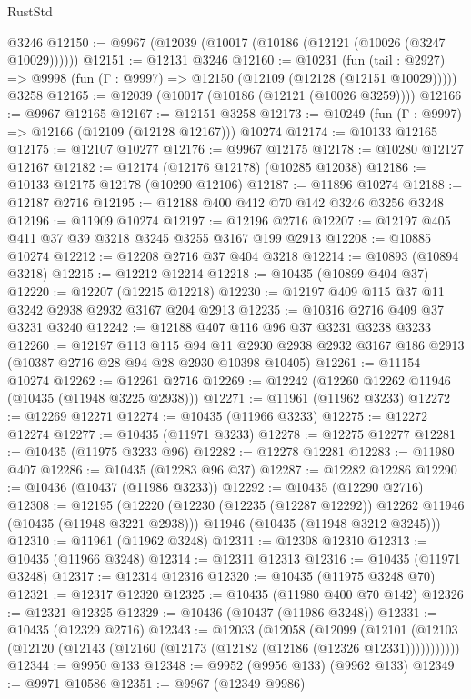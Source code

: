 \begin{lexlean}{RustStd}
\begin{coremodule}
    @3246
@12150 := @9967 (@12039 (@10017 (@10186 (@12121 (@10026 (@3247 @10029))))))
@12151 := @12131 @3246
@12160 := @10231
    (fun (tail : @2927) => @9998 (fun (Γ : @9997) => @12150 (@12109 (@12128 (@12151 @10029)))))
    @3258
@12165 := @12039 (@10017 (@10186 (@12121 (@10026 @3259))))
@12166 := @9967 @12165
@12167 := @12151 @3258
@12173 := @10249 (fun (Γ : @9997) => @12166 (@12109 (@12128 @12167))) @10274
@12174 := @10133 @12165
@12175 := @12107 @10277
@12176 := @9967 @12175
@12178 := @10280 @12127 @12167
@12182 := @12174 (@12176 @12178) (@10285 @12038)
@12186 := @10133 @12175 @12178 (@10290 @12106)
@12187 := @11896 @10274
@12188 := @12187 @2716
@12195 := @12188 @400 @412 @70 @142 @3246 @3256 @3248
@12196 := @11909 @10274
@12197 := @12196 @2716
@12207 := @12197 @405 @411 @37 @39 @3218 @3245 @3255 @3167 @199 @2913
@12208 := @10885 @10274
@12212 := @12208 @2716 @37 @404 @3218
@12214 := @10893 (@10894 @3218)
@12215 := @12212 @12214
@12218 := @10435 (@10899 @404 @37)
@12220 := @12207 (@12215 @12218)
@12230 := @12197 @409 @115 @37 @11 @3242 @2938 @2932 @3167 @204 @2913
@12235 := @10316 @2716 @409 @37 @3231 @3240
@12242 := @12188 @407 @116 @96 @37 @3231 @3238 @3233
@12260 := @12197
    @113
    @115
    @94
    @11
    @2930
    @2938
    @2932
    @3167
    @186
    @2913
    (@10387 @2716 @28 @94 @28 @2930 @10398 @10405)
@12261 := @11154 @10274
@12262 := @12261 @2716
@12269 := @12242 (@12260 @12262 @11946 (@10435 (@11948 @3225 @2938)))
@12271 := @11961 (@11962 @3233)
@12272 := @12269 @12271
@12274 := @10435 (@11966 @3233)
@12275 := @12272 @12274
@12277 := @10435 (@11971 @3233)
@12278 := @12275 @12277
@12281 := @10435 (@11975 @3233 @96)
@12282 := @12278 @12281
@12283 := @11980 @407
@12286 := @10435 (@12283 @96 @37)
@12287 := @12282 @12286
@12290 := @10436 (@10437 (@11986 @3233))
@12292 := @10435 (@12290 @2716)
@12308 := @12195
    (@12220
      (@12230 (@12235 (@12287 @12292)) @12262 @11946 (@10435 (@11948 @3221 @2938)))
      @11946
      (@10435 (@11948 @3212 @3245)))
@12310 := @11961 (@11962 @3248)
@12311 := @12308 @12310
@12313 := @10435 (@11966 @3248)
@12314 := @12311 @12313
@12316 := @10435 (@11971 @3248)
@12317 := @12314 @12316
@12320 := @10435 (@11975 @3248 @70)
@12321 := @12317 @12320
@12325 := @10435 (@11980 @400 @70 @142)
@12326 := @12321 @12325
@12329 := @10436 (@10437 (@11986 @3248))
@12331 := @10435 (@12329 @2716)
@12343 := @12033
    (@12058
      (@12099
        (@12101 (@12103 (@12120 (@12143 (@12160 (@12173 (@12182 (@12186 (@12326 @12331)))))))))))
@12344 := @9950 @133
@12348 := @9952 (@9956 @133) (@9962 @133)
@12349 := @9971 @10586
@12351 := @9967 (@12349 @9986)

\end{coremodule}
\end{lexlean}
